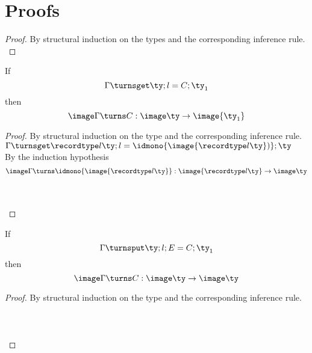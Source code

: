 \section{Proofs}

\begin{proof}
By structural induction on the types and the corresponding inference rule. \\








\end{proof}

\begin{lemma}
  If $$ \Gamma \turnsget \ty ; l = C ; \ty_1 $$
  then $$ \image \Gamma \turns C : \image \ty \to \image {\ty_1} $$
\end{lemma}

\begin{proof}
By structural induction on the type and the corresponding inference rule. \\

 $ \Gamma \turnsget \recordtype l \ty ; l = \idmono {\image {\recordtype l \ty})} ; \ty $ \\

By the induction hypothesis
$$ \image \Gamma \turns \idmono {\image {\recordtype l \ty}} : \image {\recordtype l \ty} \to \image \ty $$

 \\
 \\

\end{proof}

\begin{lemma}
  If $$ \Gamma \turnsput \ty ; l ; E = C ; \ty_1 $$
  then $$ \image \Gamma \turns C : \image \ty \to \image \ty $$
\end{lemma}

\begin{proof}
By structural induction on the type and the corresponding inference rule. \\

 \\
 \\
 \\
\end{proof}

